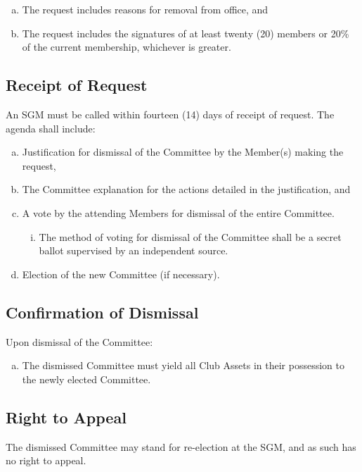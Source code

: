\documentclass[a4paper,12pt]{article}
\begin{document}
\begin{enumerate}[a)]
	\item The request includes reasons for removal from office, and
	\item The request includes the signatures of at least twenty (20) members or 20\% of the current membership, whichever is greater.
\end{enumerate}

\subsection{Receipt of Request}

An SGM must be called within fourteen (14) days of receipt of request. The agenda shall include:

\begin{enumerate}[a)]
	\item Justification for dismissal of the Committee by the Member(s) making the request,
	\item The Committee explanation for the actions detailed in the justification, and
	\item A vote by the attending Members for dismissal of the entire Committee.
	\begin{enumerate}[i)]
		\item The method of voting for dismissal of the Committee shall be a secret ballot supervised by an independent source.
	\end{enumerate}
	\item Election of the new Committee (if necessary).
\end{enumerate}

\subsection{Confirmation of Dismissal}

Upon dismissal of the Committee:

\begin{enumerate}[a)]
	\item The dismissed Committee must yield all Club Assets in their possession to the newly elected Committee.
\end{enumerate}

\subsection{Right to Appeal}

The dismissed Committee may stand for re-election at the SGM, and as such has no right to appeal.
\end{document}
